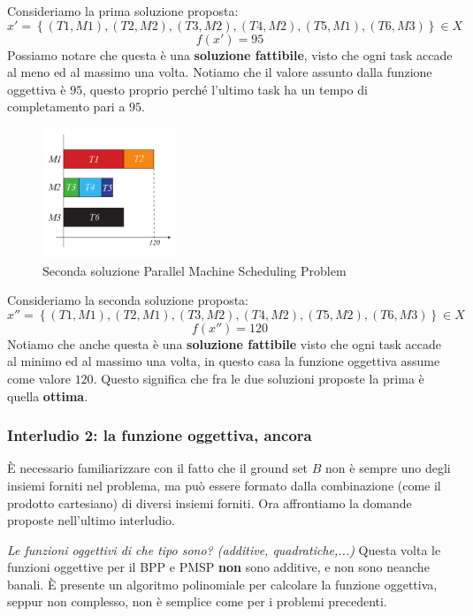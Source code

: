\documentclass{article}
\begin{document}
Consideriamo la prima soluzione proposta:
$$x'=\left\{(T1,M1),(T2,M2),(T3,M2),(T4,M2),(T5,M1),(T6,M3)\right\}\in X$$
$$f(x')=95$$
Possiamo notare che questa è una \textbf{soluzione fattibile},
visto che ogni task accade al meno ed al massimo una volta.
Notiamo che il valore assunto dalla funzione oggettiva è $95$, questo proprio
perché l'ultimo task ha un tempo di completamento pari a $95$.

\begin{figure}[H]
    \centering
    \includegraphics[width=4cm]{images/sol2_PMSP.png}
    \caption{Seconda soluzione Parallel Machine Scheduling Problem}
    \label{fig:sol2_PMSP}
\end{figure}

Consideriamo la seconda soluzione proposta:
$$x''=\left\{(T1,M1),(T2,M1),(T3,M2),(T4,M2),(T5,M2),(T6,M3)\right\}\in X$$
$$f(x'')=120$$
Notiamo che anche questa è una \textbf{soluzione fattibile} visto che ogni task accade al
minimo ed al massimo una volta, in questo casa la funzione oggettiva assume come valore $120$.
Questo significa che fra le due soluzioni proposte la prima è quella \textbf{ottima}.

\subsubsection{Interludio 2: la funzione oggettiva, ancora}
È necessario familiarizzare con il fatto che il ground set $B$ non è sempre uno degli insiemi
forniti nel problema, ma può essere formato dalla combinazione (come il prodotto cartesiano)
di diversi insiemi forniti. Ora affrontiamo la domande proposte nell'ultimo interludio.

\textit{Le funzioni oggettivi di che tipo sono? (additive, quadratiche,...)}
Questa volta le funzioni oggettive per il BPP e PMSP \textbf{non} sono additive, e non sono neanche banali.
È presente un algoritmo polinomiale per calcolare la funzione oggettiva, seppur non complesso,
non è semplice come per i problemi precedenti.
\end{document}
